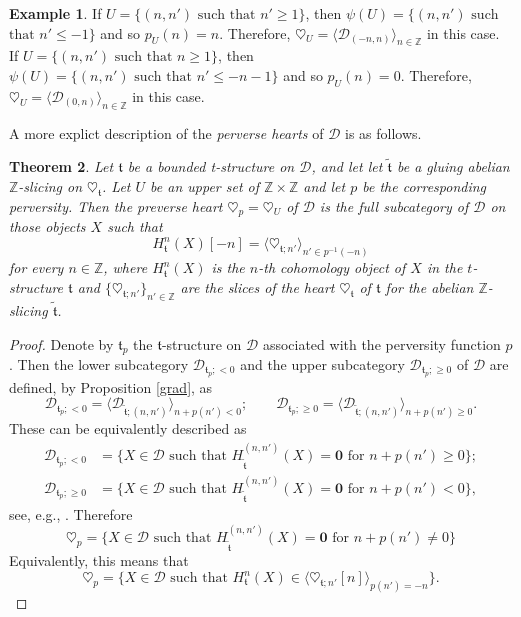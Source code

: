 \documentclass{article}
\newtheorem{thm}{Theorem}[section]
\theoremstyle{definition}
\newtheorem{exmp}[thm]{Example}
\newcommand{\Z}{\mathbb{Z}}
\newcommand{\tee}{\mathfrak{t}}
\begin{document}
\begin{exmp}
If $U=\{(n,n')\text{ such that } n'\geq 1\}$, then $\psi(U)=\{(n,n')\text{ such}$ $\text{that } n'\leq -1\}$ and so $p_U(n)=n$. Therefore, $\heartsuit_U=\langle \mathscr{D}_{(-n,n)}\rangle_{n\in \Z}$ in this case. If $U=\{(n,n')\text{ such that } n\geq 1\}$, then $\psi(U)=\{(n,n')\text{ such that } n'\leq -n-1\}$ and so $p_U(n)=0$. Therefore, $\heartsuit_U=\langle \mathscr{D}_{(0,n)}\rangle_{n\in \Z}$ in this case.
\end{exmp}
A more explict description of the \emph{perverse hearts} of $\mathscr{D}$ is as follows.
\begin{thm}\label{perverse-heart}
Let $\mathfrak{t}$ be a bounded t-structure on $\mathscr{D}$, and let let $\tilde{\tee}$ be a gluing abelian $\mathbb{Z}$-slicing on $\heartsuit_{\mathfrak{t}}$. Let $U$ be an upper set of $\Z\times \Z$ and let $p$ be the corresponding perversity. Then the preverse heart $\heartsuit_p=\heartsuit_U$ of $\mathscr{D}$ is the full subcategory of $\mathscr{D}$ on those objects $X$ such that 
\[
H_\tee^{n}(X)[-n]= \langle \heartsuit_{\tee;n'}\rangle_{n'\in p^{-1}(-n)}
\]
for every $n\in \Z$, where $H_\tee^{n}(X)$ is the $n$-th cohomology object of $X$ in the $t$-structure $\tee$ and $\{\heartsuit_{\tee;n'}\}_{n'\in \Z}$ are the slices of the heart $\heartsuit_\tee$ of $\tee$ for the abelian $\Z$-slicing $\tilde{\tee}$.
 \end{thm}
 \begin{proof}
 Denote by $\tee_p$ the $\tee$-structure on $\mathscr{D}$ associated with the perversity function $p$. Then the lower subcategory $\mathscr{D}_{\tee_p;<0}$ and the upper subcategory $\mathscr{D}_{\tee_p;\geq 0}$ of $\mathscr{D}$ are defined, by Proposition \ref{grad}, as 
 \[
 \mathscr{D}_{\tee_p;<0}=\langle \mathscr{D}_{\tilde{\tee};(n,n')}\rangle_{n+p(n')<0}; \qquad \mathscr{D}_{\tee_p;\geq 0}=\langle \mathscr{D}_{\tilde{\tee};(n,n')}\rangle_{n+p(n')\geq 0}.
 \]
 These can be equivalently described as
\begin{align*}
 \mathscr{D}_{\tee_p;<0}&=\{X\in \mathscr{D}\text { such that } H_{\tilde{\tee}}^{(n,n')}(X)=\mathbf{0}\text{ for } n+p(n')\geq 0\};\\
   \mathscr{D}_{\tee_p;\geq 0}&=\{X\in \mathscr{D}\text { such that } H_{\tilde{\tee}}^{(n,n')}(X)=\mathbf{0}\text{ for } n+p(n')< 0\},
\end{align*}
 see, e.g., \cite[Remark 4.27]{fosco}. Therefore
 \[
 \heartsuit_p=\{X\in \mathscr{D}\text{ such that } H_{\tilde{\tee}}^{(n,n')}(X)=\mathbf{0}\text{ for } n+p(n')\neq 0\}
 \]
 Equivalently, this means that
  \[
 \heartsuit_p=\{X\in \mathscr{D}\text{ such that } H_{\tee}^{n}(X)\in \langle \heartsuit_{\tee;n'}[n]\rangle_{p(n')=-n}\}.
 \]
\end{proof}
\end{document}
